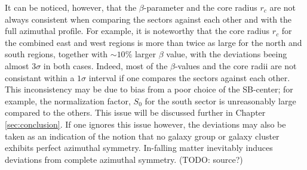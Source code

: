 It can be noticed, however, that the \(\beta\)-parameter and the core radius \(r_c\) are not always consistent when comparing the sectors against each other and with the full azimuthal profile. For example, it is noteworthy that the core radius \(r_c\) for the combined east and west regions is more than twice as large for the north and south regions, together with \(\sim 10\%\) larger \(\beta\) value, with the deviations beeing almost \(3\sigma\) in both cases. Indeed, most of the \(\beta\)-values and the core radii are not consistant within a \(1\sigma\) interval if one compares the sectors against each other. This inconsistency may be due to bias from a poor choice of the SB-center; for example, the normalization factor, \(S_0\) for the south sector is unreasonably large compared to the others. This issue will be discussed further in Chapter \ref{sec:conclusion}. If one ignores this issue however, the deviations may also be taken as an indication of the notion that no galaxy group or galaxy cluster exhibits perfect azimuthal symmetry. In-falling matter inevitably induces deviations from complete azimuthal symmetry. (TODO: source?)
